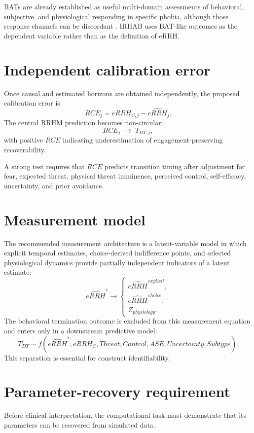 \documentclass[11pt]{article}
\begin{document}
BATs are already established as useful multi-domain assessments of behavioral, subjective, and physiological responding in specific phobia, although those response channels can be discordant \cite{tripartite2011}. IRHAB uses BAT-like outcomes as the dependent variable rather than as the definition of eRRH.

\section{Independent calibration error}
Once causal and estimated horizons are obtained independently, the proposed calibration error is
\[
RCE_j=eRRH_{C,j}-\widehat{eRRH}_j.
\]
The central RRHM prediction becomes non-circular:
\[
RCE_j\;\longrightarrow\;T_{DT,j},
\]
with positive $RCE$ indicating underestimation of engagement-preserving recoverability.

A strong test requires that $RCE$ predicts transition timing after adjustment for fear, expected threat, physical threat imminence, perceived control, self-efficacy, uncertainty, and prior avoidance.

\section{Measurement model}
The recommended measurement architecture is a latent-variable model in which explicit temporal estimates, choice-derived indifference points, and selected physiological dynamics provide partially independent indicators of a latent estimate:
\[
\widehat{eRRH}^{*}
\rightarrow
\begin{cases}
\widehat{eRRH}^{\,explicit},\\
\widehat{eRRH}^{\,choice},\\
Z_{physiology}.
\end{cases}
\]
The behavioral termination outcome is excluded from this measurement equation and enters only in a downstream predictive model:
\[
T_{DT}\sim f(\widehat{eRRH}^{*},eRRH_C,Threat,Control,ASE,Uncertainty,Subtype).
\]
This separation is essential for construct identifiability.

\section{Parameter-recovery requirement}
Before clinical interpretation, the computational task must demonstrate that its parameters can be recovered from simulated data.
\end{document}
